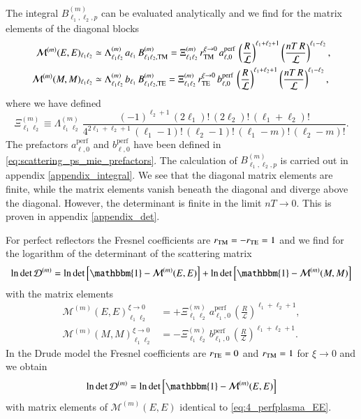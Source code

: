 The integral $B_{\ell_1, \ell_2,p}^{(m)}$ can be evaluated analytically and we
find for the matrix elements of the diagonal blocks
\begin{align}
\label{scattering_ps_xi0_EE}
\mathcal{M}^{(m)}(E,E)_{\ell_1 \ell_2} &\simeq \Lambda_{\ell_1 \ell_2}^{(m)} \, a_{\ell_1} \, B_{\ell_1 \ell_2, \mathrm{TM}}^{(m)} = \Xi_{\ell_1 \ell_2}^{(m)} \, r_{\mathrm{TM}}^{\xi\to0} \, a_{\ell,0}^\text{perf} \, \left(\frac{R}{\mathcal{L}}\right)^{\ell_1+\ell_2+1} \left(\frac{nT \, R}{\mathcal{L}}\right)^{\ell_1-\ell_2}, \\
\label{scattering_ps_xi0_MM}
\mathcal{M}^{(m)}(M,M)_{\ell_1 \ell_2} &\simeq \Lambda_{\ell_1 \ell_2}^{(m)} \, b_{\ell_1} \, B_{\ell_1 \ell_2, \mathrm{TE}}^{(m)} = \Xi_{\ell_1 \ell_2}^{(m)} \, r_{\mathrm{TE}}^{\xi\to0} \, b_{\ell,0}^\text{perf} \, \left(\frac{R}{\mathcal{L}}\right)^{\ell_1+\ell_2+1} \left(\frac{nT \, R}{\mathcal{L}}\right)^{\ell_1-\ell_2},
\end{align}
where we have defined
\begin{equation}
\Xi_{\ell_1 \ell_2}^{(m)} \equiv \Lambda_{\ell_1 \ell_2}^{(m)} \, \frac{(-1)^{\ell_2+1} \, (2\ell_1)! \, (2\ell_2)! \, (\ell_1+\ell_2)!}{4^{2\ell_1+\ell_2+1} \, (\ell_1-1)! \, (\ell_2-1)! \, (\ell_1-m)! \, (\ell_2-m)!}.
\end{equation}
The prefactors $a_{\ell,0}^\text{perf}$ and $b_{\ell,0}^\text{perf}$ have been
defined in \eqref{eq:scattering_ps_mie_prefactors}. The calculation of $B_{\ell_1, \ell_2,p}^{(m)}$ is
carried out in appendix \ref{appendix_integral}. We see that the diagonal
matrix elements are finite, while the matrix elements vanish beneath the diagonal
and diverge above the diagonal. However, the determinant is finite in
the limit $nT\to0$. This is proven in appendix \ref{appendix_det}.

For perfect reflectors the Fresnel coefficients are $r_{\mathrm{TM}}=-r_{\mathrm{TE}}=1$ and we
find for the logarithm of the determinant of the scattering matrix
\begin{equation}
\log \det\mathcal{D}^{(m)} = \log \det\left[\mathbbm{1} - \mathcal{M}^{(m)}(E,E)\right] + \log \det\left[\mathbbm{1} - \mathcal{M}^{(m)}(M,M)\right]
\end{equation}
with the matrix elements
\begin{align}
\label{eq:4_perfplasma_EE}
\mathcal{M}^{(m)}(E,E)_{\ell_1 \ell_2}^{\xi\to 0} &= +\Xi_{\ell_1 \ell_2}^{(m)} \, a_{\ell_1,0}^\text{perf} \, \left(\frac{R}{\mathcal{L}}\right)^{\ell_1+\ell_2+1}, \\
\label{eq:4_perfplasma_MM}
\mathcal{M}^{(m)}(M,M)_{\ell_1 \ell_2}^{\xi\to 0} &= -\Xi_{\ell_1 \ell_2}^{(m)} \, b_{\ell_1,0}^\text{perf} \, \left(\frac{R}{\mathcal{L}}\right)^{\ell_1+\ell_2+1}.
\end{align}
In the Drude model the Fresnel coefficients are $r_{\mathrm{TE}}=0$ and $r_{\mathrm{TM}}=1$ for $\xi\to0$
and we obtain
\begin{equation}
\log\det\mathcal{D}^{(m)} = \log\det\left[\mathbbm{1} - \mathcal{M}^{(m)}(E,E)\right]
\end{equation}
with matrix elements of $\mathcal{M}^{(m)}(E,E)$ identical to \eqref{eq:4_perfplasma_EE}.


